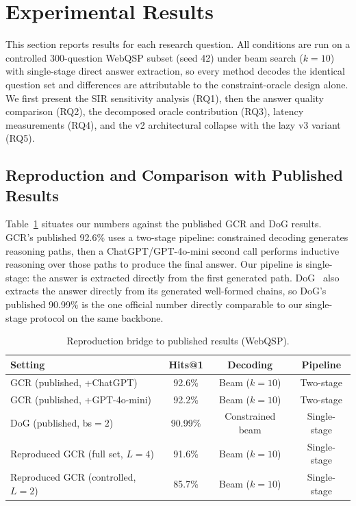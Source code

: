 
\section{Experimental Results}
\label{sec:results}

This section reports results for each research question. All conditions are run on a
controlled 300-question WebQSP subset (seed 42) under beam search ($k{=}10$) with
single-stage direct answer extraction, so every method decodes the identical question
set and differences are attributable to the constraint-oracle design alone. We first
present the SIR sensitivity analysis (RQ1), then the answer quality comparison (RQ2),
the decomposed oracle contribution (RQ3), latency measurements (RQ4), and the v2
architectural collapse with the lazy v3 variant (RQ5).

\subsection{Reproduction and Comparison with Published Results}
\label{sec:results:reproduction}

Table~\ref{tab:repro} situates our numbers against the published GCR and DoG results.
GCR's published 92.6\% uses a two-stage pipeline: constrained decoding generates
reasoning paths, then a ChatGPT/GPT-4o-mini second call performs inductive reasoning
over those paths to produce the final answer. Our pipeline is single-stage: the answer
is extracted directly from the first generated path. DoG~\citep{li2024-decoding-on-graphs}
also extracts the answer directly from its generated well-formed chains, so DoG's
published 90.99\% is the one official number directly comparable to our single-stage
protocol on the same backbone.

\begin{table}[htpb]
  \centering
  \caption{Reproduction bridge to published results (WebQSP).}
  \label{tab:repro}
  \begin{tabular}{@{}lccc@{}}
    \toprule
    Setting & Hits@1 & Decoding & Pipeline \\
    \midrule
    GCR (published, +ChatGPT)     & 92.6\% & Beam ($k{=}10$) & Two-stage    \\
    GCR (published, +GPT-4o-mini) & 92.2\% & Beam ($k{=}10$) & Two-stage    \\
    DoG (published, bs$=2$)       & 90.99\% & Constrained beam & Single-stage \\
    Reproduced GCR (full set, $L{=}4$) & 91.6\% & Beam ($k{=}10$) & Single-stage \\
    Reproduced GCR (controlled, $L{=}2$) & 85.7\% & Beam ($k{=}10$) & Single-stage \\
    \bottomrule
  \end{tabular}
\end{table}

